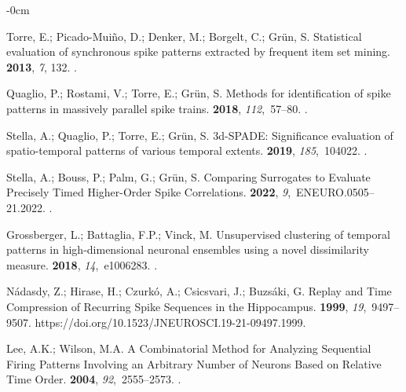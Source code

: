\documentclass[brainsci, %
               review,accept,pdftex,moreauthors
               ]{Definitions/mdpi}
\begin{document}
\begin{adjustwidth}{-\extralength}{0cm}
\begin{thebibliography}{999}
Torre, E.; Picado-Muiño, D.; Denker, M.; Borgelt, C.; Grün, S.
\newblock Statistical evaluation of synchronous spike patterns extracted by
  frequent item set mining.
 {\bf 2013}, {\em 7}, 132.
.

Quaglio, P.; Rostami, V.; Torre, E.; Grün, S.
\newblock Methods for identification of spike patterns in massively parallel
  spike trains.
 {\bf 2018}, {\em 112},~57--80.
.

Stella, A.; Quaglio, P.; Torre, E.; Grün, S.
\newblock 3d-{SPADE}: {Significance} evaluation of spatio-temporal patterns of
  various temporal extents.
 {\bf 2019}, {\em 185},~104022.
.

Stella, A.; Bouss, P.; Palm, G.; Grün, S.
\newblock Comparing {Surrogates} to {Evaluate} {Precisely} {Timed}
  {Higher}-{Order} {Spike} {Correlations}.
 {\bf 2022}, {\em 9},~ENEURO.0505--21.2022.
.

Grossberger, L.; Battaglia, F.P.; Vinck, M.
\newblock Unsupervised clustering of temporal patterns in high-dimensional
  neuronal ensembles using a novel dissimilarity measure.
 {\bf 2018}, {\em 14},~e1006283.
.

Nádasdy, Z.; Hirase, H.; Czurkó, A.; Csicsvari, J.; Buzsáki, G.
\newblock Replay and {Time} {Compression} of {Recurring} {Spike} {Sequences} in
  the {Hippocampus}.
 {\bf 1999}, {\em 19},~9497--9507.
  {{https://doi.org/10.1523/JNEUROSCI.19-21-09497.1999}}.

Lee, A.K.; Wilson, M.A.
\newblock A {Combinatorial} {Method} for {Analyzing} {Sequential} {Firing}
  {Patterns} {Involving} an {Arbitrary} {Number} of {Neurons} {Based} on
  {Relative} {Time} {Order}.
 {\bf 2004}, {\em 92},~2555--2573.
.


\end{thebibliography}
\end{adjustwidth}
\end{document}
